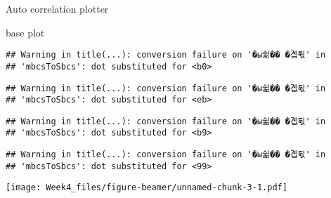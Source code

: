 \documentclass[ignorenonframetext,]{beamer}
\begin{document}
\begin{frame}[fragile]{Auto correlation plotter}
\begin{block}{base plot}
\begin{verbatim}
## Warning in title(...): conversion failure on '�ы쉶�� �곕튃' in
## 'mbcsToSbcs': dot substituted for <b0>
\end{verbatim}

\begin{verbatim}
## Warning in title(...): conversion failure on '�ы쉶�� �곕튃' in
## 'mbcsToSbcs': dot substituted for <eb>
\end{verbatim}

\begin{verbatim}
## Warning in title(...): conversion failure on '�ы쉶�� �곕튃' in
## 'mbcsToSbcs': dot substituted for <b9>
\end{verbatim}

\begin{verbatim}
## Warning in title(...): conversion failure on '�ы쉶�� �곕튃' in
## 'mbcsToSbcs': dot substituted for <99>
\end{verbatim}

\texttt{[image: Week4\_files/figure-beamer/unnamed-chunk-3-1.pdf]}

\end{block}

\end{frame}
\end{document}
